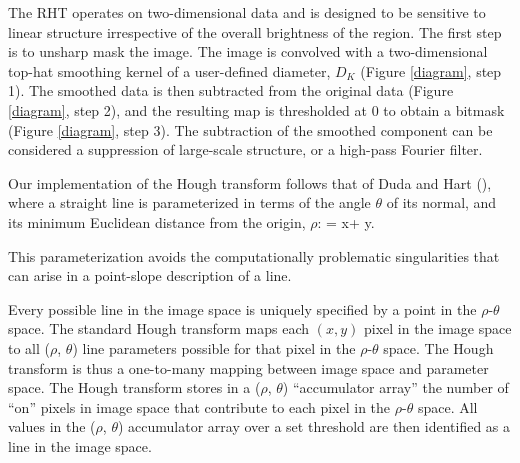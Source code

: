 The RHT operates on two-dimensional data and is designed to be sensitive to linear structure irrespective of the overall brightness of the region. The first step is to unsharp mask the image. The image is convolved with a two-dimensional top-hat smoothing kernel of a user-defined diameter, $D_K$ (Figure \ref{diagram}, step 1). The smoothed data is then subtracted from the original data (Figure \ref{diagram}, step 2), and the resulting map is thresholded at 0 to obtain a bitmask (Figure \ref{diagram}, step 3). The subtraction of the smoothed component can be considered a suppression of large-scale structure, or a high-pass Fourier filter.

Our implementation of the Hough transform follows that of Duda and Hart (\citeyear{Duda:1972uj}), where a straight line is parameterized in terms of the angle $\theta$ of its normal, and its minimum Euclidean distance from the origin, $\rho$:
\beq
\rho = x\cos\theta + y\sin\theta. 
\eeq

\noindent This parameterization avoids the computationally problematic singularities that can arise in a point-slope description of a line.

Every possible line in the image space is uniquely specified by a point in the ${\rho}$-${\theta}$ space. The standard Hough transform maps each $(x, y)$ pixel in the image space to all (${\rho}$, ${\theta}$) line parameters possible for that pixel in the $\rho$-$\theta$ space. The Hough transform is thus a one-to-many mapping between image space and parameter space. The Hough transform stores in a (${\rho}$, ${\theta}$) ``accumulator array'' the number of ``on'' pixels in image space that contribute to each pixel in the $\rho$-$\theta$ space. All values in the (${\rho}$, ${\theta}$) accumulator array over a set threshold are then identified as a line in the image space.

